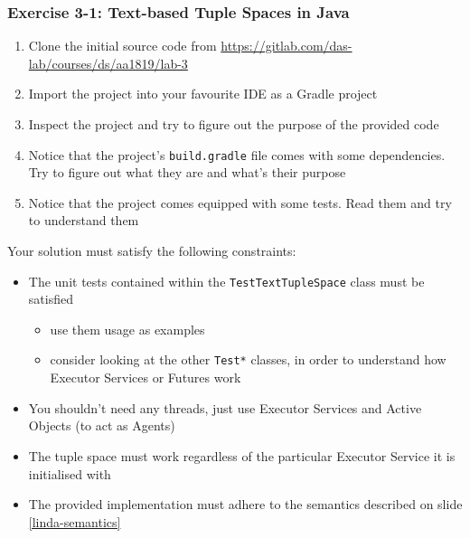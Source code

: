 \documentclass[presentation]{beamer}\mode<presentation>{\usetheme{AMSCesenaPurpleAndGold}}
\begin{document}
\begin{frame}[allowframebreaks]
\frametitle{Exercise 3-1: Text-based Tuple Spaces in Java}

\begin{enumerate}
	\item Clone the initial source code from \url{https://gitlab.com/das-lab/courses/ds/aa1819/lab-3}
	
	\item Import the project into your favourite IDE as a Gradle project
	
	\item Inspect the project and try to figure out the purpose of the provided code
	
	\item Notice that the project's \texttt{build.gradle} file comes with some dependencies.
	Try to figure out what they are and what's their purpose
	
	\item Notice that the project comes equipped with some tests. 
	Read them and try to understand them
\end{enumerate}



\framebreak

Your solution must satisfy the following constraints:
%
\begin{itemize}
	
	\item The \alert{unit tests} contained within the \alert{\texttt{TestTextTupleSpace}} class must be satisfied
	\begin{itemize}
		\item use them usage as examples
		\item consider looking at the other \texttt{Test*} classes, in order to understand how Executor Services or Futures work
	\end{itemize}
	
	\item You \alert{shouldn't need any threads}, just use Executor Services and Active Objects (to act as Agents)
	
	\item The tuple space must work regardless of the particular Executor Service it is initialised with
	
	\item The provided implementation must adhere to the \alert{\linda{} semantics} described on slide \ref{linda-semantics}
	

\end{itemize}
\end{frame}
\end{document}

